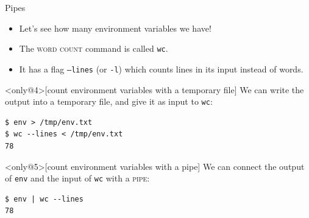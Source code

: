 \begin{frame}[fragile]{Pipes}
  \begin{itemize}
    \item
      Let's see how many environment variables we have!
      \pause
    \item
      \alert<2>{The \textsc{word count} command is called \texttt{wc}.}
      \pause
    \item
      It has a flag \texttt{--lines} (or \texttt{-l}) which counts lines in its
      input instead of words.
      \pause
  \end{itemize}
  \begin{example}<only@4>[count environment variables with a temporary file]
    We can write the output into a temporary file, and give it as input to
    \texttt{wc}:
  \begin{verbatim}
$ env > /tmp/env.txt
$ wc --lines < /tmp/env.txt
78
  \end{verbatim}
  \end{example}
  \pause
  \begin{example}<only@5>[count environment variables with a pipe]
    We can connect the output of \texttt{env} and the input of \texttt{wc} with
    a \textsc{pipe}:
  \begin{verbatim}
$ env | wc --lines
78
  \end{verbatim}
  \end{example}
\end{frame}

